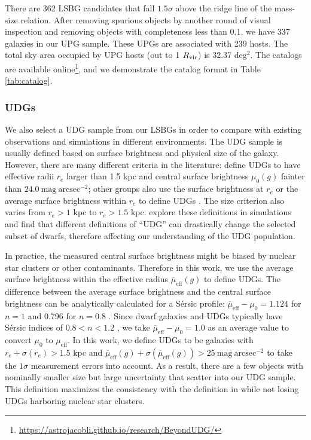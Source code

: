 \documentclass[twocolumn,astrosymb,twocolappendix]{aastex631}
\newcommand{\sbunit}{\mathrm{mag\ arcsec}^{-2}}
\newcommand{\sbeff}{\overline{\mu}_{\mathrm{eff}}(g)}
\newcommand{\sersic}{S\'ersic}
\begin{document}
\begin{CJK*}{UTF8}{gbsn}
There are 362 LSBG candidates that fall $1.5\sigma$ above the ridge line of the mass-size relation. After removing spurious objects by another round of visual inspection and removing objects with completeness less than 0.1, we have 337 galaxies in our UPG sample. These UPGs are associated with 239 hosts. The total sky area occupied by UPG hosts (out to 1 $R_{\rm{vir}}$) is 32.37 deg$^{2}$. The catalogs are available online\footnote{\url{https://astrojacobli.github.io/research/BeyondUDG/}}, and we demonstrate the catalog format in Table \ref{tab:catalog}.

\subsubsection{UDGs}
We also select a UDG sample from our LSBGs in order to compare with existing observations and simulations in different environments. The UDG sample is usually defined based on surface brightness and physical size of the galaxy. However, there are many different criteria in the literature: \citet{vanDokkum2015} define UDGs to have effective radii $r_e$ larger than 1.5 kpc and central surface brightness $\mu_0(g)$ fainter than $24.0\ \sbunit$; other groups also use the surface brightness at $r_e$ \citep[e.g.,][]{DiCintio2017,Cardona-Barrero2020} or the average surface brightness within $r_e$ to define UDGs \citep[e.g.,][]{Koda2015,Yagi2016,vdBurg2016,Leisman2017,Martin2019,Karunakaran2022b}. The size criterion also varies from $r_e > 1$ kpc to $r_e > 1.5$ kpc. \citet{vanNest2022} explore these definitions in simulations and find that different definitions of ``UDG'' can drastically change the selected subset of dwarfs, therefore affecting our understanding of the UDG population.

In practice, the measured central surface brightness might be biased by nuclear star clusters \citep{Neumayer2020,ELVES-II,Somalwar2020} or other contaminants. Therefore in this work, we use the average surface brightness within the effective radius $\sbeff$ to define UDGs. The difference between the average surface brightness and the central surface brightness can be analytically calculated for a \sersic{} profile: $\overline{\mu}_{\mathrm{eff}} - \mu_0 = 1.124$ for $n=1$ and 0.796 for $n=0.8$ \citep{Graham2005,Yagi2016}. Since dwarf galaxies and UDGs typically have \sersic{} indices of $0.8 < n < 1.2$ \citep[e.g.,][]{vanDokkum2015,ELVES-I}, we take $\overline{\mu}_{\mathrm{eff}} - \mu_0 = 1.0$ as an average value to convert $\mu_0$ to $\mu_{\mathrm{eff}}$. In this work, we define UDGs to be galaxies with $r_e+\sigma(r_e) > 1.5$ kpc and $\sbeff + \sigma(\sbeff) > 25\ \sbunit$ to take the $1\sigma$ measurement errors into account. As a result, there are a few objects with nominally smaller size but large uncertainty that scatter into our UDG sample. This definition maximizes the consistency with the definition in \citet{vanDokkum2015} while not losing UDGs harboring nuclear star clusters.


\end{CJK*}
\end{document}
